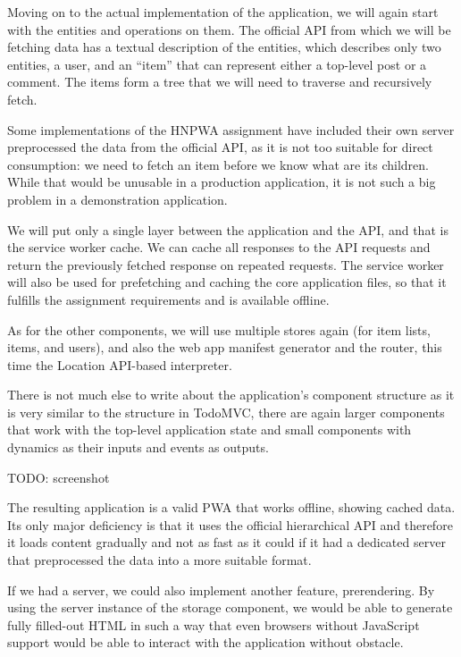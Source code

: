 \documentclass[english,odsaz]{fitthesis}
\begin{document}
Moving on to the actual implementation of the application, we will again start
with the entities and operations on them. The official API from which we will be
fetching data has a textual description of the entities, which describes only
two entities, a user, and an ``item'' that can represent either a top-level
post or a comment. The items form a tree that we will need to traverse and
recursively fetch.

Some implementations of the HNPWA assignment have included their own server
preprocessed the data from the official API, as it is not too suitable for
direct consumption: we need to fetch an item before we know what are its
children. While that would be unusable in a production application, it is not
such a big problem in a demonstration application.

We will put only a single layer between the application and the API, and that is
the service worker cache. We can cache all responses to the API requests and
return the previously fetched response on repeated requests. The service worker
will also be used for prefetching and caching the core application files, so
that it fulfills the assignment requirements and is available offline.

As for the other components, we will use multiple stores again (for item lists,
items, and users), and also the web app manifest generator and the router, this
time the Location API-based interpreter.

There is not much else to write about the application's component structure as
it is very similar to the structure in TodoMVC, there are again larger
components that work with the top-level application state and small components
with dynamics as their inputs and events as outputs.

TODO: screenshot

The resulting application is a valid PWA that works offline, showing cached
data. Its only major deficiency is that it uses the official hierarchical API
and therefore it loads content gradually and not as fast as it could if it had a
dedicated server that preprocessed the data into a more suitable format.

If we had a server, we could also implement another feature, prerendering. By
using the server instance of the storage component, we would be able to generate
fully filled-out HTML in such a way that even browsers without JavaScript
support would be able to interact with the application without obstacle.
\end{document}

